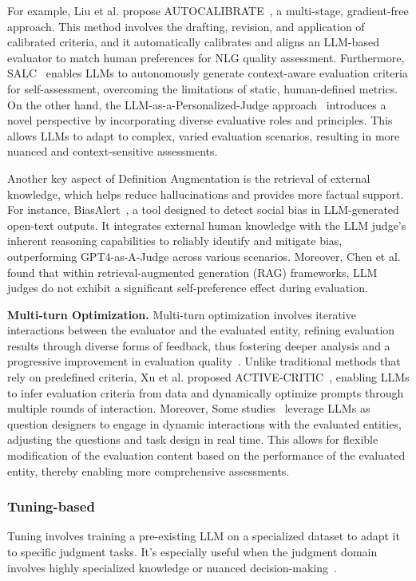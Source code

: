 For example, Liu et al. propose AUTOCALIBRATE~\cite{liu2023calibrating}, a multi-stage, gradient-free approach. This method involves the drafting, revision, and application of calibrated criteria, and it automatically calibrates and aligns an LLM-based evaluator to match human preferences for NLG quality assessment.
Furthermore, SALC~\cite{gupta2024unveiling} enables LLMs to autonomously generate context-aware evaluation criteria for self-assessment, overcoming the limitations of static, human-defined metrics. 
On the other hand, the LLM-as-a-Personalized-Judge approach~\cite{dong2024can} introduces a novel perspective by incorporating diverse evaluative roles and principles. This allows LLMs to adapt to complex, varied evaluation scenarios, resulting in more nuanced and context-sensitive assessments.

Another key aspect of Definition Augmentation is the retrieval of external knowledge, which helps reduce hallucinations and provides more factual support. For instance, BiasAlert~\cite{fan2024biasalert}, a tool designed to detect social bias in LLM-generated open-text outputs. It integrates external human knowledge with the LLM judge's inherent reasoning capabilities to reliably identify and mitigate bias, outperforming GPT4-as-A-Judge across various scenarios.
Moreover, Chen et al.~\cite{chen2024llms} found that within retrieval-augmented generation (RAG) frameworks, LLM judges do not exhibit a significant self-preference effect during evaluation.


\textbf{Multi-turn Optimization.}
Multi-turn optimization involves iterative interactions between the evaluator and the evaluated entity, refining evaluation results through diverse forms of feedback, thus fostering deeper analysis and a progressive improvement in evaluation quality~\cite{zhou2024fairer}.
Unlike traditional methods that rely on predefined criteria, Xu et al. proposed ACTIVE-CRITIC~\cite{xu2024large}, enabling LLMs to infer evaluation criteria from data and dynamically optimize prompts through multiple rounds of interaction. Moreover, 
Some studies~\cite{zhao2024auto,luo2024videoautoarena,bai2024benchmarking,yu2024kieval} leverage LLMs as question designers to engage in dynamic interactions with the evaluated entities, adjusting the questions and task design in real time. This allows for flexible modification of the evaluation content based on the performance of the evaluated entity, thereby enabling more comprehensive assessments.


\subsubsection{Tuning-based}
\label{sec:Tuning}
\par Tuning involves training a pre-existing LLM on a specialized dataset to adapt it to specific judgment tasks. It's especially useful when the judgment domain involves highly specialized knowledge or nuanced decision-making~\cite{huang2024limitations}.




